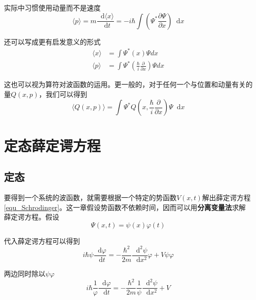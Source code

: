 \documentclass[UTF8]{ctexart}
\newcommand*{\dif}{\mathop{}\!\mathrm{d}}
\begin{document}
    实际中习惯使用动量而不是速度
    \begin{equation}
        \langle p \rangle = m \frac{\dif \langle x \rangle}{\dif t} = - i \hbar \int \left(\Psi^* \frac{\partial \Psi}{\partial x}\right) \dif x
    \end{equation}

\noindent 还可以写成更有启发意义的形式
    \begin{equation}
    \begin{aligned}\langle x\rangle &=\int \Psi^{*}(x) \Psi d x \\\langle p\rangle &=\int \Psi^{*}\left(\frac{\hbar}{i} \frac{\partial}{\partial x}\right) \Psi d x \end{aligned}
    \end{equation}

\noindent 这也可以视为算符对波函数的运用。更一般的，对于任何一个与位置和动量有关的量$Q(x,p)$，我们可以得到
    \begin{equation}
        \langle Q(x,p) \rangle = \int \Psi^* Q \left(x,\frac{\hbar}{i} \frac{\partial}{\partial x}\right) \Psi \dif x
    \end{equation}

    \section{定态薛定谔方程}
    \subsection{定态}
    要得到一个系统的波函数，就需要根据一个特定的势函数$V(x,t)$解出薛定谔方程\autoref{equ_Schrodinger}。这一章假设势函数不依赖时间，因而可以用\textbf{分离变量法}求解薛定谔方程。假设
    \begin{equation}
        \Psi(x,t) = \psi(x) \varphi (t) \label{equ2.1}
    \end{equation}

\noindent 代入薛定谔方程可以得到
    \begin{equation}
        i \hbar \psi \frac{\dif \varphi}{\dif t} = -\frac{\hbar^2}{2m} \frac{\dif^2 \psi}{\dif x^2} \varphi + V \psi \varphi
    \end{equation}

\noindent 两边同时除以$\psi \varphi$
    \begin{equation}
        i \hbar \frac{1}{\varphi} \frac{\dif \varphi}{\dif t} = -\frac{\hbar^2}{2m} \frac{1}{\psi} \frac{\dif^2 \psi}{\dif x^2}  + V
    \end{equation}
\end{document}
